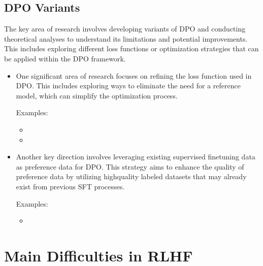 \documentclass[letterpaper,11pt,english]{sphinxmanual}
\begin{document}
\subsection{DPO Variants}
\label{\detokenize{rlhf:dpo-variants}}
\sphinxAtStartPar
The key area of research involves developing variants of DPO and
conducting theoretical analyses to understand its limitations and
potential improvements. This includes exploring different loss functions
or optimization strategies that can be applied within the DPO framework.
\begin{itemize}
\item {} 
\sphinxAtStartPar
One significant area of research focuses on refining the loss function
used in DPO. This includes exploring ways to eliminate the need for a
reference model, which can simplify the optimization process.

\sphinxAtStartPar
Examples:
\begin{itemize}
\item {} 
\sphinxAtStartPar
{}

\item {} 
\sphinxAtStartPar
{}

\end{itemize}

\item {} 
\sphinxAtStartPar
Another key direction involves leveraging existing supervised
fine\sphinxhyphen{}tuning data as preference data for DPO. This strategy aims to
enhance the quality of preference data by utilizing high\sphinxhyphen{}quality
labeled datasets that may already exist from previous SFT processes.

\sphinxAtStartPar
Examples:
\begin{itemize}
\item {} 
\sphinxAtStartPar
{}

\end{itemize}

\end{itemize}


\section{Main Difficulties in RLHF}
\label{\detokenize{rlhf:main-difficulties-in-rlhf}}
\end{document}
